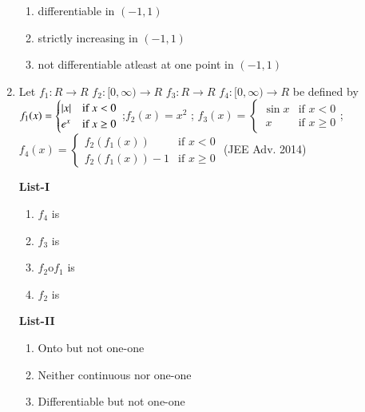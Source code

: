 \documentclass[journal,12pt,twocolumn]{IEEEtran}
\theoremstyle{remark}
\begin{document}
\begin{enumerate}
\begin{multicols}{2}
\begin{enumerate}
					\item differentiable in $(-1,1)$

					\item strictly increasing in $(-1,1)$

					\item  not differentiable atleast at one point in  $(-1,1)$
				\end{enumerate}
			\end{multicols}
		\item Let $f_1:R\to R$ $f_2:[0,\infty)\to R$ $f_3:R\to R$ $f_4:[0,\infty)\to R$ be defined by
		$f_1(x)=
        \begin{cases}
		\left\vert x\right\vert & \text{if } x < 0 \\
                 e^x & \text{if } x \geq 0 
                 \end{cases}$
		 ;$f_2(x)=x^2$ ;
		 $f_3(x) =
                 \begin{cases}
			 \sin{x} & \text{if }  x < 0 \\
                    \ x & \text{if }  x\geq 0
                  \end{cases}$;
	        $f_4(x) =
                  \begin{cases}
                     f_2(f_1(x)) & \text{if } x < 0 \\
                     f_2(f_1(x))-1 & \text{if } x \geq 0 
                  \end{cases}$
                  \hfill(JEE Adv. 2014)
                 \begin{multicols}{2} 
				\textbf{List-I} 
				\begin{enumerate}[label=\Alph*., start=16]
					\item $f_4$ is
					\item $f_3$ is 
					\item $f_2$o$f_1$ is 
					\item $f_2$ is
				\end{enumerate}
				\columnbreak
				\textbf{List-II}
				\begin{enumerate}[label=\arabic*.]
					\item  Onto but not one-one 

					\item  Neither continuous nor one-one 

					\item  Differentiable but not one-one 


\end{enumerate}
\end{multicols}
\end{enumerate}
\end{document}
